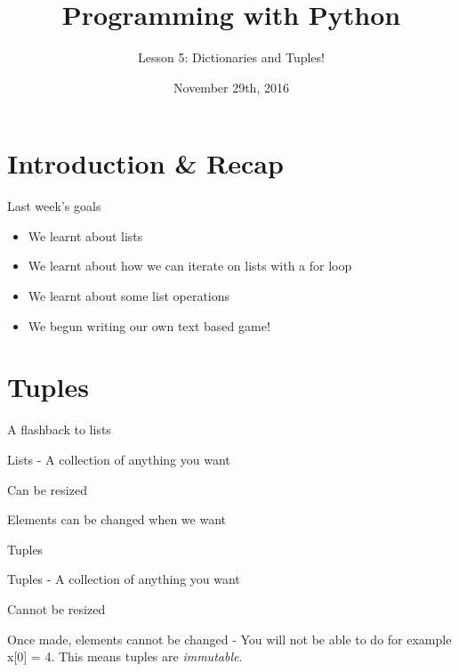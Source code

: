 \documentclass{beamer}
\title{Programming with Python}
\subtitle{Lesson 5: Dictionaries and Tuples!}
\date{November 29th, 2016}
\begin{document}
\begin{frame}
  \titlepage
\end{frame}


\section{Introduction \& Recap}

\begin{frame}{Last week's goals}
\pause
  \begin{itemize}
  \item We learnt about lists\pause
  \item We learnt about how we can iterate on lists with a for loop\pause
  \item We learnt about some list operations\pause
  \item We begun writing our own text based game!
  \end{itemize}
  
\end{frame}

\section{Tuples}

\begin{frame}{A flashback to lists}

Lists - A collection of anything you want\\ \pause

Can be resized\\ \pause

Elements can be changed when we want

\end{frame}

\begin{frame}{Tuples}

Tuples - A collection of anything you want\\ \pause

Cannot be resized\\ \pause

Once made, elements cannot be changed - You will not be able to do for example x[0] = 4. \pause This means tuples are \textit{immutable}.

\end{frame}
\end{document}
